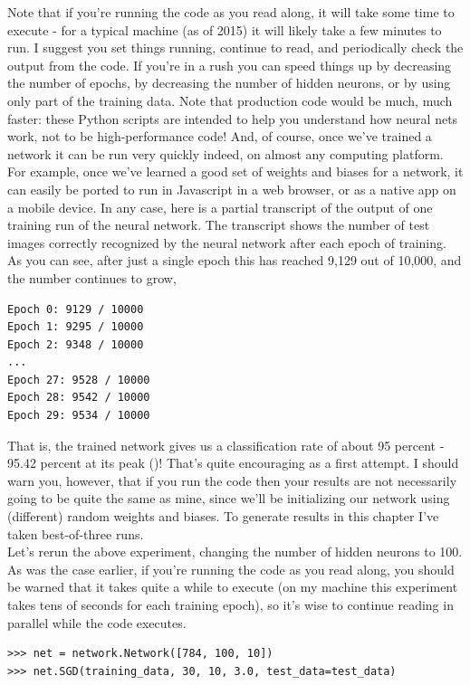 Note that if you're running the code as you read along, it will take some time to execute - for a typical machine (as of 2015) it will likely take a few minutes to run. I suggest you set things running, continue to read, and periodically check the output from the code. If you're in a rush you can speed things up by decreasing the number of epochs, by decreasing the number of hidden neurons, or by using only part of the training data. Note that production code would be much, much faster: these Python scripts are intended to help you understand how neural nets work, not to be high-performance code! And, of course, once we've trained a network it can be run very quickly indeed, on almost any computing platform. For example, once we've learned a good set of weights and biases for a network, it can easily be ported to run in Javascript in a web browser, or as a native app on a mobile device. In any case, here is a partial transcript of the output of one training run of the neural network. The transcript shows the number of test images correctly recognized by the neural network after each epoch of training. As you can see, after just a single epoch this has reached 9,129 out of 10,000, and the number continues to grow,

\begin{lstlisting}
Epoch 0: 9129 / 10000
Epoch 1: 9295 / 10000
Epoch 2: 9348 / 10000
...
Epoch 27: 9528 / 10000
Epoch 28: 9542 / 10000
Epoch 29: 9534 / 10000
\end{lstlisting}

That is, the trained network gives us a classification rate of about 95 percent - 95.42 percent at its peak ()! That's quite encouraging as a first attempt. I should warn you, however, that if you run the code then your results are not necessarily going to be quite the same as mine, since we'll be initializing our network using (different) random weights and biases. To generate results in this chapter I've taken best-of-three runs.\\

Let's rerun the above experiment, changing the number of hidden neurons to 100. As was the case earlier, if you're running the code as you read along, you should be warned that it takes quite a while to execute (on my machine this experiment takes tens of seconds for each training epoch), so it's wise to continue reading in parallel while the code executes.

\begin{lstlisting}
>>> net = network.Network([784, 100, 10])
>>> net.SGD(training_data, 30, 10, 3.0, test_data=test_data)
\end{lstlisting}

